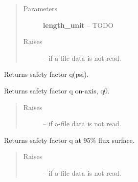 \documentclass[letterpaper,10pt,english]{sphinxmanual}
\begin{document}
\begin{fulllineitems}
\begin{fulllineitems}
\begin{quote}
\begin{description}
\item[{Parameters}] \leavevmode
\textbf{length\_unit} -- TODO

\item[{Raises}] \leavevmode
{} -- if a-file data is not read.

\end{description}\end{quote}

\end{fulllineitems}


\begin{fulllineitems}
\label{eqtools:eqtools.eqdskreader.EqdskReader.getQProfile}
Returns safety factor q(psi).

\end{fulllineitems}


\begin{fulllineitems}
\label{eqtools:eqtools.eqdskreader.EqdskReader.getQ0}
Returns safety factor q on-axis, q0.
\begin{quote}\begin{description}
\item[{Raises}] \leavevmode
{} -- if a-file data is not read.

\end{description}\end{quote}

\end{fulllineitems}


\begin{fulllineitems}
\label{eqtools:eqtools.eqdskreader.EqdskReader.getQ95}
Returns safety factor q at 95\% flux surface.
\begin{quote}\begin{description}
\item[{Raises}] \leavevmode
{} -- if a-file data is not read.

\end{description}\end{quote}

\end{fulllineitems}


\end{fulllineitems}
\end{document}
